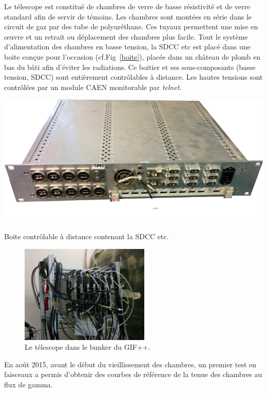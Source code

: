 Le télescope est constitué de chambres de verre de basse résistivité et de verre standard afin de servir de témoins. Les chambres sont montées en série dans le circuit de gaz par des tube de polyuréthane. Ces tuyaux permettent une mise en œuvre et un retrait ou déplacement des chambres plus facile. Tout le système d'alimentation des chambres en basse tension, la SDCC etc est placé dans une boite conçue pour l'occasion (cf.Fig~\ref{boite}), placée dans un château de plomb en bas du bâti afin d'éviter les radiations. Ce boitier et ses sous-composants (basse tension, SDCC) sont entièrement contrôlables à distance. Les hautes tensions sont contrôlées par un module CAEN monitorable par \textit{telnet}.

\marginpar
{
	\centering
	\includegraphics[width=1.0\marginparwidth]{GLA/boite.png}
	\captionsetup{type=figure}\caption{Boite contrôlable à distance contenant la SDCC etc.}
	\label{boite}
}

\begin{figure}[!ht]
	\centering
	\includegraphics[width=0.55\textwidth]{GLA/GIFppChambers.png}
	\caption{Le télescope dans le bunker du GIF++.}
	\label{GIFppChambers}
\end{figure}

En août \num{2015}, avant le début du vieillissement des chambres, un premier test en faisceaux a permis d'obtenir des courbes de référence de la tenue des chambres au flux de gamma.

